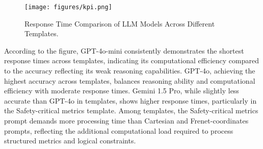 \begin{figure}[ht]
    \centering
    \texttt{[image: figures/kpi.png]} 
    \caption{Response Time Comparison of LLM Models Across Different Templates.}
    \label{fig:kpi} %
\end{figure}
According to the figure, GPT-4o-mini consistently demonstrates the shortest response times across templates, indicating its computational efficiency compared to the accuracy reflecting its weak reasoning capabilities. GPT-4o, achieving the highest accuracy across templates, balances reasoning ability and computational efficiency with moderate response times. Gemini 1.5 Pro, while slightly less accurate than GPT-4o in templates, shows higher response times, particularly in the Safety-critical metrics template. Among templates, the Safety-critical metrics prompt demands more processing time than Cartesian and Frenet-coordinates prompts, reflecting the additional computational load required to process structured metrics and logical constraints. 


